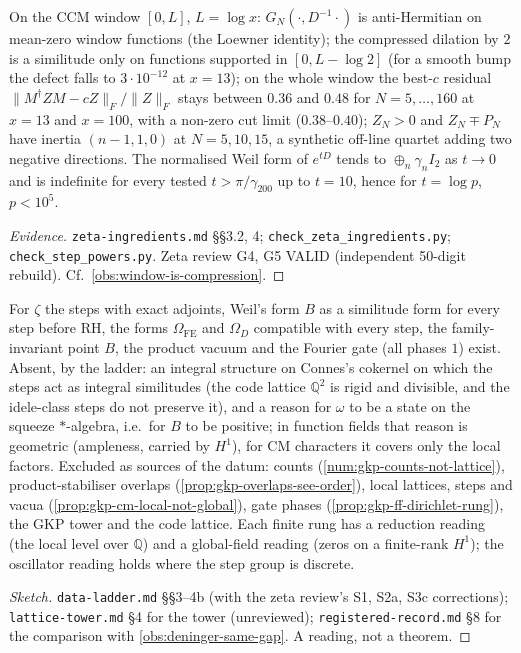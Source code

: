 \begin{numerical}
\label{num:gkp-window-prime-step} 
On the CCM window $[0,L]$, $L = \log x$: $G_N(\cdot,D^{-1}\cdot)$ is anti-Hermitian on mean-zero window functions (the Loewner identity); the compressed dilation by $2$ is a
similitude only on functions supported in $[0,L-\log2]$ (for a smooth bump the defect falls to $3\cdot10^{-12}$ at $x = 13$); on the whole window the best-$c$ residual
$\|M^\dagger ZM-cZ\|_F/\|Z\|_F$ stays between $0.36$ and $0.48$ for $N = 5,\dots,160$ at $x = 13$ and $x = 100$, with a non-zero cut limit ($0.38$--$0.40$); $Z_N>0$ and $Z_N\mp
P_N$ have inertia $(n-1,1,0)$ at $N = 5,10,15$, a synthetic off-line quartet adding two negative directions. The normalised Weil form of $e^{tD}$ tends to $\oplus_n\gamma_nI_2$
as $t\to0$ and is indefinite for every tested $t>\pi/\gamma_{200}$ up to $t = 10$, hence for $t = \log p$, $p<10^5$.
\end{numerical}
\begin{proof}[Evidence] \texttt{zeta-ingredients.md} \S\S3.2, 4; \texttt{check\_zeta\_ingredients.py}; \texttt{check\_step\_powers.py}. Zeta review G4, G5 VALID (independent
50-digit rebuild).  Cf.\ \cref{obs:window-is-compression}.
\end{proof}
\begin{observation}
\label{obs:gkp-missing-datum} 
For $\zeta$ the steps with exact adjoints, Weil's form $B$ as a similitude form for every step before RH, the forms $\Omega_{\mathrm{FE}}$ and $\Omega_D$ compatible with every %
step, the family-invariant point $B$, the product vacuum and the Fourier gate (all phases $1$) exist. Absent, by the ladder: an integral structure on Connes's cokernel on which
the steps act as integral similitudes (the code lattice $\mathbb Q^2$ is rigid and divisible, and the idele-class steps do not preserve it), and a reason for $\omega$ to be a
state on the squeeze $*$-algebra, i.e.\ for $B$ to be positive; in function fields that reason is geometric (ampleness, carried by $H^1$), for CM characters it covers only the
local factors. Excluded as sources of the datum: counts (\cref{num:gkp-counts-not-lattice}), product-stabiliser overlaps (\cref{prop:gkp-overlaps-see-order}), local lattices,
steps and vacua (\cref{prop:gkp-cm-local-not-global}), gate phases (\cref{prop:gkp-ff-dirichlet-rung}), the GKP tower and the code lattice. Each finite rung has a reduction
reading (the local level over $\mathbb Q$) and a global-field reading (zeros on a finite-rank $H^1$); the oscillator reading holds where the step group is discrete.
\end{observation}
\begin{proof}[Sketch] \texttt{data-ladder.md} \S\S3--4b (with the zeta review's S1, S2a, S3c corrections); \texttt{lattice-tower.md} \S4 for the tower (unreviewed);
\texttt{registered-record.md} \S8 for the comparison with \cref{obs:deninger-same-gap}. A reading, not a theorem.
\end{proof}
